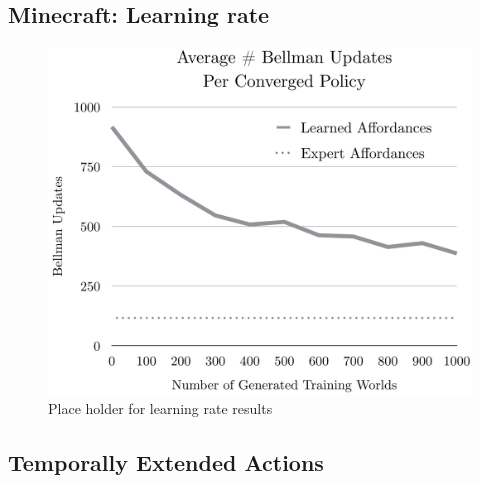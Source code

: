 \documentclass[conference]{IEEEtran}
\begin{document}
\subsection{Minecraft: Learning rate}

\begin{figure}[H]
\centering
\includegraphics[scale=0.195]{figures/training_results.png}%
  \caption{Place holder for learning rate results}
  \label{fig:training_results}
\end{figure}

\subsection{Temporally Extended Actions}
\end{document}
